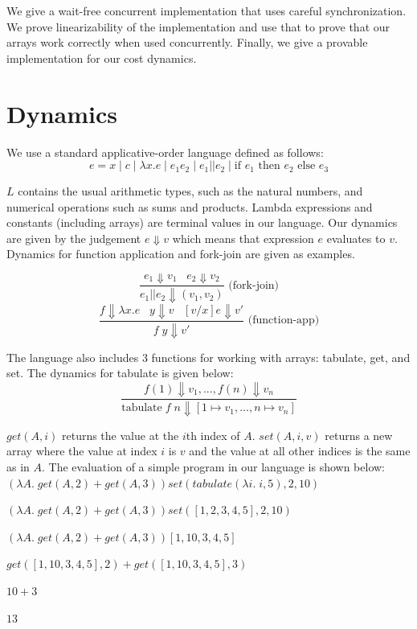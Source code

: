 \documentclass[preprint]{sigplanconf}
\begin{document}
We give a wait-free concurrent implementation that uses careful synchronization. We prove linearizability of the implementation and use that to prove that our arrays work correctly when used concurrently. Finally, we give a provable implementation for our cost dynamics.

\section{Dynamics}

We use a standard applicative-order language defined as follows:
$$e = x \; | \; c  \; | \; \lambda x.e \; | \; e_1 e_2 \; | \; e_1 || e_2 \; | \; \text{if } e_1 \text{ then } e_2 \text{ else } e_3$$

$L$ contains the usual arithmetic types, such as the natural numbers, and numerical operations such as sums and products. Lambda expressions and constants (including arrays) are terminal values in our language. Our dynamics are given by the judgement $e \Downarrow v$ which means that expression $e$ evaluates to $v$. Dynamics for function application and fork-join are given as examples.

$$\frac{e_1 \Downarrow v_1 \;\;\; e_2 \Downarrow v_2}{e_1 || e_2 \Downarrow (v_1, v_2)} \text{ (fork-join)}$$
$$\frac{f \Downarrow \lambda x . e \;\;\; y \Downarrow v \;\;\; [v/x]e \Downarrow v'}{f \; y \Downarrow v'} \text{ (function-app)}$$

The language also includes 3 functions for working with arrays: tabulate, get, and set. The dynamics for tabulate is given below:
$$\frac{f(1) \Downarrow v_1, ..., f(n) \Downarrow v_n}{\text{tabulate} \; f \; n \Downarrow [1 \mapsto v_1, ..., n \mapsto v_n]}$$

$get(A,i)$ returns the value at the $i$th index of $A$. $set(A,i,v)$ returns a new array where the value at index $i$ is $v$ and the value at all other indices is the same as in $A$. The evaluation of a simple program in our language is shown below:\\

$(\lambda A. \; get(A, 2) + get(A,3)) set(tabulate(\lambda i . \; i, 5), 2, 10)$

$(\lambda A. \; get(A, 2) + get(A,3)) set([1,2,3,4,5], 2, 10)$

$(\lambda A. \; get(A, 2) + get(A,3)) [1,10,3,4,5]$

$get([1,10,3,4,5], 2) + get([1,10,3,4,5],3) $

$10+3$

$13$
\end{document}
